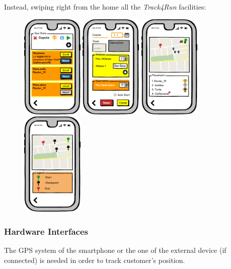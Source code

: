 \documentclass[a4paper]{article}
\begin{document}
        Instead, swiping right from the home all the \textit{Track4Run} facilities:
        \begin{figure}[!htpb]
    	\centering
    	\includegraphics[height=50mm]{images/mockups/RunManager.png}
    	\includegraphics[height=50mm]{images/mockups/RunCreate.png}
    	\includegraphics[height=50mm]{images/mockups/ShowMap.png}
    	\includegraphics[height=50mm]{images/mockups/DefineTrack.png}
        \end{figure}
        \newpage
        \subsubsection{Hardware Interfaces}
        The GPS system of the smartphone or the one of the external device (if connected) is needed in order to track customer's position.
        
\end{document}
